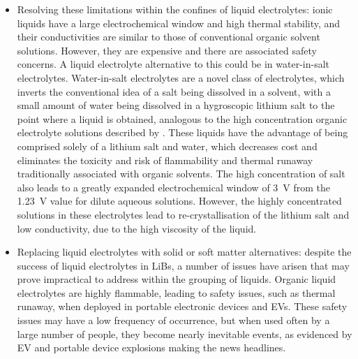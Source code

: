 \documentclass[../main.tex]{subfiles}
\begin{document}
\begin{itemize}
    \item Resolving these limitations within the confines of liquid electrolytes: ionic liquids have a large electrochemical window and high thermal stability, and their conductivities are similar to those of conventional organic solvent solutions.\cite{macfarlane2014energy} However, they are expensive and there are associated safety concerns.\cite{kralisch2005energetic, smiglak2006combustible} A liquid electrolyte alternative to this could be in water-in-salt electrolytes. Water-in-salt electrolytes are a novel class of electrolytes, which inverts the conventional idea of a salt being dissolved in a solvent, with a small amount of water being dissolved in a hygroscopic lithium salt to the point where a liquid is obtained,\cite{suo2015water,chen2020water} analogous to the high concentration organic electrolyte solutions described by \citeauthor{Yamada_2013}.\cite{Yamada_2013} These liquids have the advantage of being comprised solely of a lithium salt and water, which decreases cost and eliminates the toxicity and risk of flammability and thermal runaway traditionally associated with organic solvents. The high concentration of salt also leads to a greatly expanded electrochemical window of 3~V \cite{suo2016advanced} from the 1.23~V value for dilute aqueous solutions. However, the highly concentrated solutions in these electrolytes lead to re-crystallisation of the lithium salt and low conductivity, due to the high viscosity of the liquid.\cite{chen2020water,li_transport_2019}

    \item Replacing liquid electrolytes with solid or soft matter alternatives: despite the success of liquid electrolytes in LiBs, a number of issues have arisen that may prove impractical to address within the grouping of liquids. Organic liquid electrolytes are highly flammable, leading to safety issues, such as thermal runaway, when deployed in portable electronic devices and EVs.\cite{Shepherd_Siddiqui, McCurry_2017, Pfrang2017} These safety issues may have a low frequency of occurrence, but when used often by a large number of people, they become nearly inevitable events, as evidenced by EV and portable device explosions making the news headlines.
    

\end{itemize}
\end{document}
